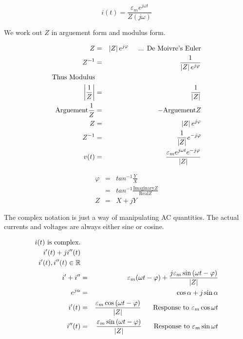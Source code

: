 \documentclass[a4paper,12pt]{article}
\begin{document}
\[ i(t) = \frac{\varepsilon_{m} e^{j \omega t}}{Z(j \omega)} \]

We work out $Z$ in arguement form and modulus form.

\begin{eqnarray*}
Z 			& = & \left| Z \right| e^{j \varphi} \mbox{\hspace{5mm}... De Moivre's
Euler} \\
Z^{-1}	& = & \frac{1}{\left| Z \right| e^{j \varphi}} \\
\mbox{Thus Modulus} & & \\
\left| \frac{1}{Z} \right| & = & \frac{1}{\left| Z \right|} \\
\mbox{Arguement} \frac{1}{Z} & = & - \mbox{Arguement} Z \\
Z			& = & \left| Z \right| e^{j \varphi} \\
Z^{-1}	& = & \frac{1}{\left| Z \right|} e^{- j \varphi} \\
v(t)		& = & \frac{\varepsilon_{m} e^{j \omega t} e^{-j \varphi}}{\left|
Z \right|}
\end{eqnarray*}

\begin{eqnarray*}
\varphi & = & tan^{-1}{\frac{Y}{X}} \\
		  & = & tan^{-1}{\frac{\mbox{Imaginary} Z}{\mbox{Real} Z}} \\
Z		  & = & X + j Y
\end{eqnarray*}

The complex notation is just a way of manipulating AC quantities. The
actual currents and voltages are always either sine or cosine.

\begin{eqnarray*}
i(t) \mbox{ is complex.} & & \\
i'(t) + j i''(t) & & \\
i'(t), i''(t) \in \mathbb{R} & & \\
i' + i'' & = & \varepsilon_{m}{(\omega t - \varphi)} + 
\frac{j \varepsilon_{m} \sin{(\omega t - \varphi)}}{\left|Z \right|} \\
e^{j \alpha} & = & \cos{\alpha} + j \sin{\alpha} \\
i'(t) & = & \frac{\varepsilon_{m} \cos{(\omega t - \varphi)}}{\left| Z
\right|} \mbox{\hspace{5mm} Response to } \varepsilon_{m} \cos{\omega t} \\
i''(t) & = & \frac{\varepsilon_{m} \sin{(\omega t - \varphi)}}{\left| Z
\right|} \mbox{\hspace{5mm} Response to } \varepsilon_{m} \sin{\omega t} \\
\end{eqnarray*}
\end{document}
